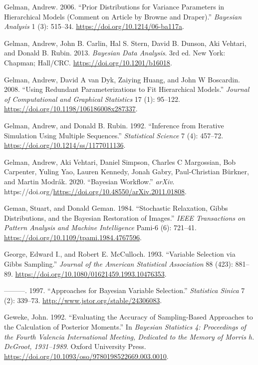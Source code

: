 \documentclass[
  11pt,
  letterpaper,
]{scrbook}
\newlength{\cslhangindent}
\newenvironment{CSLReferences}[2] %
 {\begin{list}{}{%
  \setlength{\itemindent}{0pt}
  \setlength{\leftmargin}{0pt}
  \setlength{\parsep}{0pt}
  \ifodd #1
   \setlength{\leftmargin}{\cslhangindent}
   \setlength{\itemindent}{-1\cslhangindent}
  \fi
  \setlength{\itemsep}{#2\baselineskip}}}
 {\end{list}}
\theoremstyle{definition}
\theoremstyle{plain}
\theoremstyle{plain}
\theoremstyle{plain}
\theoremstyle{definition}
\theoremstyle{definition}
\theoremstyle{remark}
\begin{document}
\begin{CSLReferences}{1}{0}
Gelman, Andrew. 2006. {``Prior Distributions for Variance Parameters in
Hierarchical Models (Comment on Article by {B}rowne and {D}raper).''}
\emph{Bayesian Analysis} 1 (3): 515--34.
\url{https://doi.org/10.1214/06-ba117a}.

Gelman, Andrew, John B. Carlin, Hal S. Stern, David B. Dunson, Aki
Vehtari, and Donald B. Rubin. 2013. \emph{Bayesian Data Analysis}. 3rd
ed. New York: Chapman; Hall/CRC. \url{https://doi.org/10.1201/b16018}.

Gelman, Andrew, David A van Dyk, Zaiying Huang, and John W Boscardin.
2008. {``Using Redundant Parameterizations to Fit Hierarchical
Models.''} \emph{Journal of Computational and Graphical Statistics} 17
(1): 95--122. \url{https://doi.org/10.1198/106186008x287337}.

Gelman, Andrew, and Donald B. Rubin. 1992. {``Inference from Iterative
Simulation Using Multiple Sequences.''} \emph{Statistical Science} 7
(4): 457--72. \url{https://doi.org/10.1214/ss/1177011136}.

Gelman, Andrew, Aki Vehtari, Daniel Simpson, Charles C Margossian, Bob
Carpenter, Yuling Yao, Lauren Kennedy, Jonah Gabry, Paul-Christian
Bürkner, and Martin Modrák. 2020. {``Bayesian Workflow.''} \emph{arXiv}.
https://doi.org/\url{https://doi.org/10.48550/arXiv.2011.01808}.

Geman, Stuart, and Donald Geman. 1984. {``Stochastic Relaxation, {G}ibbs
Distributions, and the {B}ayesian Restoration of Images.''} \emph{IEEE
Transactions on Pattern Analysis and Machine Intelligence} Pami-6 (6):
721--41. \url{https://doi.org/10.1109/tpami.1984.4767596}.

George, Edward I., and Robert E. McCulloch. 1993. {``Variable Selection
via {G}ibbs Sampling.''} \emph{Journal of the American Statistical
Association} 88 (423): 881--89.
\url{https://doi.org/10.1080/01621459.1993.10476353}.

---------. 1997. {``Approaches for {B}ayesian Variable Selection.''}
\emph{Statistica Sinica} 7 (2): 339--73.
\url{http://www.jstor.org/stable/24306083}.

Geweke, John. 1992. {``Evaluating the Accuracy of Sampling-Based
Approaches to the Calculation of Posterior Moments.''} In \emph{Bayesian
Statistics 4: Proceedings of the Fourth Valencia International Meeting,
Dedicated to the Memory of Morris h. DeGroot, 1931--1989}. Oxford
University Press.
\url{https://doi.org/10.1093/oso/9780198522669.003.0010}.


\end{CSLReferences}
\end{document}
